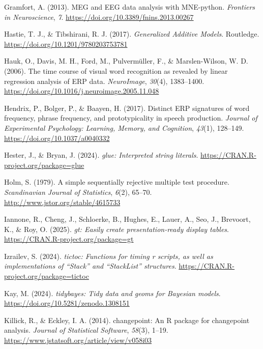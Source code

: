 \documentclass[
  doc,
  floatsintext,
  longtable,
  a4paper,
  nolmodern,
  notxfonts,
  notimes,
  donotrepeattitle,
  colorlinks=true,linkcolor=blue,citecolor=blue,urlcolor=blue]{apa7}
\newlength{\cslhangindent}
\newenvironment{CSLReferences}[2] %
 {\begin{list}{}{%
  \setlength{\itemindent}{0pt}
  \setlength{\leftmargin}{0pt}
  \setlength{\parsep}{0pt}
  \ifodd #1
   \setlength{\leftmargin}{\cslhangindent}
   \setlength{\itemindent}{-1\cslhangindent}
  \fi
  \setlength{\itemsep}{#2\baselineskip}}}
 {\end{list}}
\begin{document}
\begin{CSLReferences}{1}{0}
Gramfort, A. (2013). MEG and EEG data analysis with MNE-python.
\emph{Frontiers in Neuroscience}, \emph{7}.
\url{https://doi.org/10.3389/fnins.2013.00267}

Hastie, T. J., \& Tibshirani, R. J. (2017). \emph{Generalized Additive
Models}. Routledge. \url{https://doi.org/10.1201/9780203753781}

Hauk, O., Davis, M. H., Ford, M., Pulvermüller, F., \& Marslen-Wilson,
W. D. (2006). The time course of visual word recognition as revealed by
linear regression analysis of ERP data. \emph{NeuroImage}, \emph{30}(4),
1383--1400. \url{https://doi.org/10.1016/j.neuroimage.2005.11.048}

Hendrix, P., Bolger, P., \& Baayen, H. (2017). Distinct ERP signatures
of word frequency, phrase frequency, and prototypicality in speech
production. \emph{Journal of Experimental Psychology: Learning, Memory,
and Cognition}, \emph{43}(1), 128--149.
\url{https://doi.org/10.1037/a0040332}

Hester, J., \& Bryan, J. (2024). \emph{{glue}: Interpreted string
literals}. \url{https://CRAN.R-project.org/package=glue}

Holm, S. (1979). A simple sequentially rejective multiple test
procedure. \emph{Scandinavian Journal of Statistics}, \emph{6}(2),
65--70. \url{http://www.jstor.org/stable/4615733}

Iannone, R., Cheng, J., Schloerke, B., Hughes, E., Lauer, A., Seo, J.,
Brevoort, K., \& Roy, O. (2025). \emph{{gt}: Easily create
presentation-ready display tables}.
\url{https://CRAN.R-project.org/package=gt}

Izrailev, S. (2024). \emph{{tictoc}: Functions for timing r scripts, as
well as implementations of {``{Stack}''} and {``{StackList}''}
structures}. \url{https://CRAN.R-project.org/package=tictoc}

Kay, M. (2024). \emph{{tidybayes}: Tidy data and geoms for {Bayesian}
models}. \url{https://doi.org/10.5281/zenodo.1308151}

Killick, R., \& Eckley, I. A. (2014). {changepoint}: An {R} package for
changepoint analysis. \emph{Journal of Statistical Software},
\emph{58}(3), 1--19.
\url{https://www.jstatsoft.org/article/view/v058i03}


\end{CSLReferences}
\end{document}
